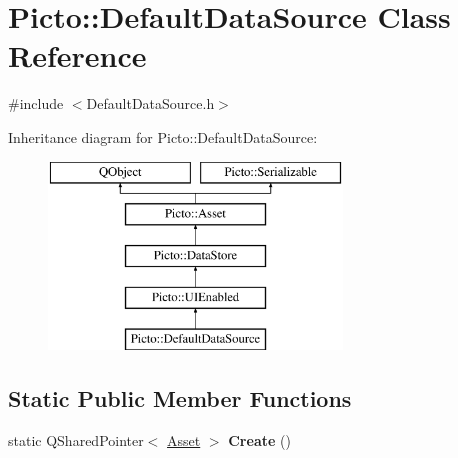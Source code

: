 \hypertarget{class_picto_1_1_default_data_source}{\section{Picto\-:\-:Default\-Data\-Source Class Reference}
\label{class_picto_1_1_default_data_source}
}


{\ttfamily \#include $<$Default\-Data\-Source.\-h$>$}

Inheritance diagram for Picto\-:\-:Default\-Data\-Source\-:\begin{figure}[H]
\begin{center}
\leavevmode
\includegraphics[height=5.000000cm]{class_picto_1_1_default_data_source}
\end{center}
\end{figure}
\subsection*{Static Public Member Functions}
\begin{DoxyCompactItemize}
\item 
\hypertarget{class_picto_1_1_default_data_source_aabaf0f1bdf4ec7ce307e83080ef0579a}{static Q\-Shared\-Pointer$<$ \hyperlink{class_picto_1_1_asset}{Asset} $>$ {\bfseries Create} ()}\label{class_picto_1_1_default_data_source_aabaf0f1bdf4ec7ce307e83080ef0579a}

\end{DoxyCompactItemize}
